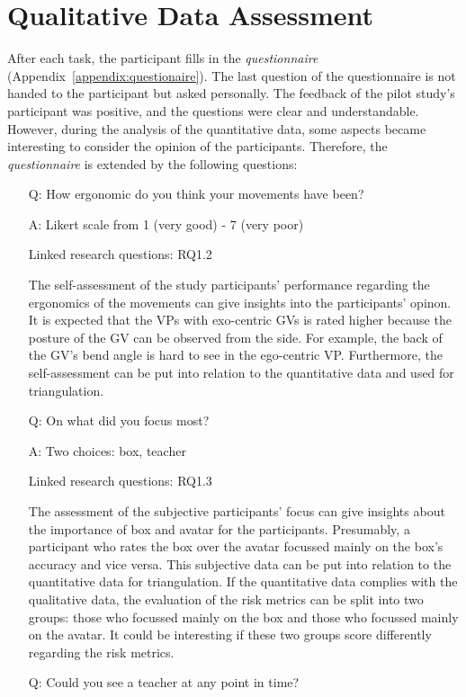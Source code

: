 \section{Qualitative Data Assessment}
\label{sec:evalQuali}
After each task, the participant fills in the \textit{questionnaire} (Appendix~\ref{appendix:questionaire}). The last question of the questionnaire is not handed to the participant but asked personally. The feedback of the pilot study's participant was positive, and the questions were clear and understandable. However, during the analysis of the quantitative data, some aspects became interesting to consider the opinion of the participants. Therefore, the \textit{questionnaire} is extended by the following questions:
\begin{itemize}
	\item[Q:] How ergonomic do you think your movements have been?
	\item[A:] Likert scale from 1 (very good) - 7 (very poor)
	\item[] Linked research questions: RQ1.2
	\item[] The self-assessment of the study participants' performance regarding the ergonomics of the movements can give insights into the participants' opinon. It is expected that the VPs with exo-centric GVs is rated higher because the posture of the GV can be observed from the side. For example, the back of the GV's bend angle is hard to see in the ego-centric VP. Furthermore, the self-assessment can be put into relation to the quantitative data and used for triangulation.
	\item[Q:] On what did you focus most?
	\item[A:] Two choices: box, teacher
	\item[] Linked research questions: RQ1.3
	\item[] The assessment of the subjective participants' focus can give insights about the importance of box and avatar for the participants. Presumably, a participant who rates the box over the avatar focussed mainly on the box's accuracy and vice versa. This subjective data can be put into relation to the quantitative data for triangulation. If the quantitative data complies with the qualitative data, the evaluation of the risk metrics can be split into two groups: those who focussed mainly on the box and those who focussed mainly on the avatar. It could be interesting if these two groups score differently regarding the risk metrics.
	\item[Q:] Could you see a teacher at any point in time?

\end{itemize}
